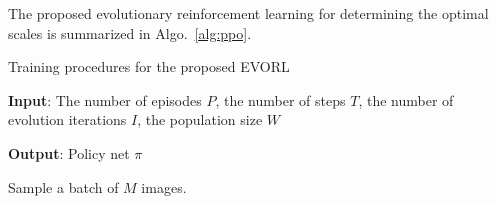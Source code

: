 \documentclass[letterpaper]{article} %
\newcommand\rjf[1]{\textcolor{red}{\{RJF: #1\}}}
\begin{document}

The proposed evolutionary reinforcement learning for determining the optimal scales is summarized in Algo.~\ref{alg:ppo}. 


\begin{algorithm}[ht]
\caption{Training procedures for the proposed EVORL}%
\label{alg:ppo}
\textbf{Input}: 
The number of episodes $P$, 
the number of steps $T$, 
the number of evolution iterations $I$, 
the population size $W$

\textbf{Output}: Policy net $\pi$ 
\begin{algorithmic}[1]

  \STATE Sample a batch of $M$ images.
  

\end{algorithmic}
\end{algorithm}
\end{document}
